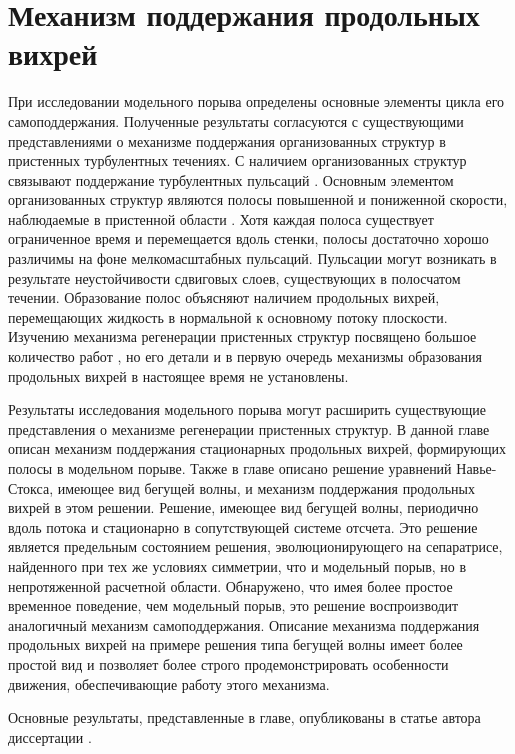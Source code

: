 \chapter{Механизм поддержания продольных вихрей}

При исследовании модельного порыва определены основные элементы цикла его самоподдержания. Полученные результаты согласуются с существующими представлениями о механизме поддержания организованных структур в пристенных турбулентных течениях. С наличием организованных структур связывают поддержание турбулентных пульсаций \cite{Kim1971}. Основным элементом организованных структур являются полосы повышенной и пониженной скорости, наблюдаемые в пристенной области \cite{Kline1967, Smith1983}. Хотя каждая полоса существует ограниченное время и перемещается вдоль стенки, полосы достаточно хорошо различимы на фоне мелкомасштабных пульсаций. Пульсации могут возникать в результате неустойчивости сдвиговых слоев, существующих в полосчатом течении. Образование полос объясняют наличием продольных вихрей, перемещающих жидкость в нормальной к основному потоку плоскости. Изучению механизма регенерации пристенных структур посвящено большое количество работ \cite{Hamilton1995, Waleffe1995, Waleffe1997, Jimenez1999, Schoppa2002}, но его детали и в первую очередь механизмы образования продольных вихрей в настоящее время не установлены. 

Результаты исследования модельного порыва могут расширить существующие представления о механизме регенерации пристенных структур. В данной главе описан механизм поддержания стационарных продольных вихрей, формирующих полосы в модельном порыве. Также в главе описано решение уравнений Навье-Стокса, имеющее вид бегущей волны, и механизм поддержания продольных вихрей в этом решении. Решение, имеющее вид бегущей волны, периодично вдоль потока и стационарно в сопутствующей системе отсчета. Это решение является предельным состоянием решения, эволюционирующего на сепаратрисе, найденного при тех же условиях симметрии, что и модельный порыв, но в непротяженной расчетной области. Обнаружено, что имея более простое временное поведение, чем модельный порыв, это решение воспроизводит аналогичный механизм самоподдержания. Описание механизма поддержания продольных вихрей на примере решения типа бегущей волны имеет более простой вид и позволяет более строго продемонстрировать особенности движения, обеспечивающие работу этого механизма. 

Основные результаты, представленные в главе, опубликованы в статье автора диссертации \cite{MZG2017, KMU17, KMU16}. 



